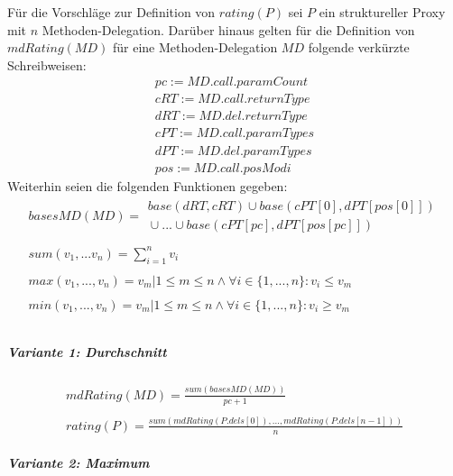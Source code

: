 \documentclass[a4paper,12pt]{article}
\begin{document}
Für die Vorschläge zur Definition von $\mathit{rating(P)}$ sei $P$ ein struktureller Proxy mit $n$ Methoden-Delegation.
Darüber hinaus gelten für die Definition von $\mathit{mdRating(MD)}$ für eine Methoden-Delegation $\mathit{MD}$ folgende verkürzte Schreibweisen:
\begin{gather*}
	\mathit{pc} := \mathit{MD.call.paramCount}
	\\
	\mathit{cRT} := \mathit{MD.call.returnType}
	\\
	\mathit{dRT} := \mathit{MD.del.returnType}
	\\
	\mathit{cPT} := \mathit{MD.call.paramTypes}
	\\
	\mathit{dPT} := \mathit{MD.del.paramTypes}
	\\
	\mathit{pos} := \mathit{MD.call.posModi}
\end{gather*}
Weiterhin seien die folgenden Funktionen gegeben:
\begin{gather*}
\mathit{basesMD(MD)} =  
				\begin{array}{l}
					  \mathit{base(dRT, cRT)} \mathit{ }\cup \mathit{base(cPT[0],dPT[pos[0]])} \\
					  \mathit{ }\cup ... \cup \mathit{base(cPT[pc],dPT[pos[pc]])}
				\end{array}    
				\\\\
				\mathit{sum(v_1,...v_n)} = \sum_{i=1}^{n}v_i
\\\\         
\mathit{max(v_1,...,v_n)} = v_{m}| 1 \leq m \leq n  \wedge \forall i \in  \{1,...,n\}: v_i \leq v_{m}
\\\\       
\mathit{min(v_1,...,v_n)} = v_{m}| 1 \leq m \leq n  \wedge \forall i \in  \{1,...,n\}: v_i \geq v_{m}
\\\\    
\end{gather*}



\subparagraph{Variante 1: Durchschnitt}

\begin{gather*}
\mathit{mdRating(MD)} = \frac{\mathit{sum(basesMD(MD))}}{\mathit{pc} + 1}
\\\\
\mathit{rating(P)} = \frac{ \mathit{sum(mdRating(P.dels[0]),...,mdRating(P.dels[n-1]))}}{n}
\end{gather*}



\subparagraph{Variante 2: Maximum}
\end{document}

